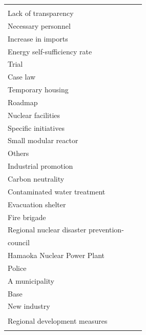 \documentclass[final,5p,times,twocolumn,authoryear]{elsarticle}
\begin{document}
\begin{table}[htbp]
\begin{tabularx}{\textwidth}{|>{\centering\arraybackslash}X|>{\centering\arraybackslash}X|>{\centering\arraybackslash}X|}
\begin{tabular}[c]{@{}l@{}}
	Interests \\ Lack of transparency \\ Necessary personnel \\ Increase in imports \\ Energy self-sufficiency rate \\ Trial \\ Case law \\ Temporary housing \\ Roadmap \\ Nuclear facilities \\ Specific initiatives \\ Small modular reactor \\ Others \\ Industrial promotion \\ Carbon neutrality \\ Contaminated water treatment \\ Evacuation shelter \\ Fire brigade \\ Regional nuclear disaster prevention-\\ council \\ Hamaoka Nuclear Power Plant \\ Police \\ A municipality \\ Base \\ New industry \\ Regional development measures
\end{tabular} 
& 
\begin{tabular}[c]{@{}l@{}}

\end{tabular}
\end{tabularx}
\end{table}
\end{document}
